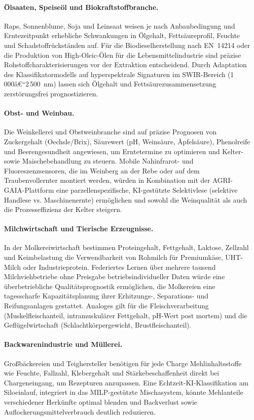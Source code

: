 \documentclass[a4paper, 12pt, twoside, openright]{report}
\theoremstyle{definition}
\theoremstyle{definition}
\begin{document}
\paragraph{Ölsaaten, Speiseöl und Biokraftstoffbranche.}
Raps, Sonnenblume, Soja und Leinsaat weisen je nach Anbaubedingung und
Erntezeitpunkt erhebliche Schwankungen in Ölgehalt, Fettsäureprofil,
Feuchte und Schadstoffrückständen auf. Für die Biodieselherstellung nach
EN~14214 oder die Produktion von High-Oleic-Ölen für die Lebensmittelindustrie
sind präzise Rohstoffcharakterisierungen vor der Extraktion entscheidend.
Durch Adaptation des Klassifikatormodells auf hyperspektrale Signaturen im
SWIR-Bereich (1\,000â€“2\,500~nm) lassen sich Ölgehalt und Fettsäurezusammensetzung
zerstörungsfrei prognostizieren.

\paragraph{Obst- und Weinbau.}
Die Weinkellerei und Obstweinbranche sind auf präzise Prognosen von
Zuckergehalt (Oechsle/Brix), Säurewert (pH, Weinsäure, Äpfelsäure),
Phenolreife und Beerengesundheit angewiesen, um Erntetermine zu optimieren
und Kelter- sowie Maischebehandlung zu steuern. Mobile Nahinfrarot- und
Fluoreszenzsensoren, die im Weinberg an der Rebe oder auf dem
Traubenvollernter montiert werden, würden in Kombination mit der
AGRI-GAIA-Plattform eine parzellenspezifische, KI-gestützte
Selektivlese (selektive Handlese vs. Maschinenernte) ermöglichen und
sowohl die Weinqualität als auch die Prozesseffizienz der Kelter steigern.

\paragraph{Milchwirtschaft und Tierische Erzeugnisse.}
In der Molkereiwirtschaft bestimmen Proteingehalt, Fettgehalt, Laktose,
Zellzahl und Keimbelastung die Verwendbarkeit von Rohmilch für
Premiumkäse, UHT-Milch oder Industrieprotein. Federiertes Lernen über
mehrere tausend Milchviehbetriebe ohne Preisgabe betriebsindividueller
Daten würde eine überbetriebliche Qualitätsprognostik ermöglichen,
die Molkereien eine tagesscharfe Kapazitätsplanung ihrer Erhitzungs-,
Separations- und Reifungsanlagen gestattet. Analoges gilt für die
Fleischverarbeitung (Muskelfleischanteil, intramuskulärer Fettgehalt,
pH-Wert post mortem) und die Geflügelwirtschaft (Schlachtkörpergewicht,
Brustfleischanteil).

\paragraph{Backwarenindustrie und Müllerei.}
Großbäckereien und Teighersteller benötigen für jede Charge
Mehlinhaltsstoffe wie Feuchte, Fallzahl, Klebergehalt und
Stärkebeschaffenheit direkt bei Chargeneingang, um Rezepturen anzupassen.
Eine Echtzeit-KI-Klassifikation am Siloeinlauf, integriert in das
MILP-gestützte Mischasystem, könnte Mehlanteile verschiedener Herkünfte
optimal blenden und Backverlust sowie Auflockerungsmittelverbrauch deutlich
reduzieren.
\end{document}

